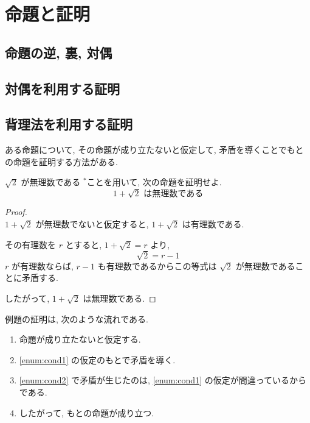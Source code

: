 \section{命題と証明}

\subsection{命題の逆, 裏, 対偶}


\newpage

\subsection{対偶を利用する証明}


\newpage

\subsection{背理法を利用する証明}

ある命題について, その命題が成り立たないと仮定して, 矛盾を導くことでもとの命題を証明する方法がある.

\begin{example}[【教p.67 例題2】]
    $\sqrt{2}$ が無理数である $^{*}$ことを用いて, 次の命題を証明せよ.
    \[1 + \sqrt{2} \text{ は無理数である}\]
\end{example}

\begin{proof}\mbox{}\\\hspace{1em}%
    $1 + \sqrt{2}$ が無理数でないと仮定すると, $1 + \sqrt{2}$ は有理数である.

    その有理数を $r$ とすると, $1 + \sqrt{2} = r$ より,
    \[\sqrt{2} = r - 1\]
    $r$ が有理数ならば, $r - 1$ も有理数であるからこの等式は $\sqrt{2}$ が無理数であることに矛盾する.

    したがって, $1 + \sqrt{2}$ は無理数である.
\end{proof}
\vspace{3em}

例題の証明は, 次のような流れである.
\begin{enumerate}
    \item \label{enum:cond1} 命題が成り立たないと仮定する.
    \item \label{enum:cond2}\ref{enum:cond1} の仮定のもとで矛盾を導く.
    \item \ref{enum:cond2} で矛盾が生じたのは, \ref{enum:cond1} の仮定が間違っているからである.
    \item したがって, もとの命題が成り立つ.
\end{enumerate}

